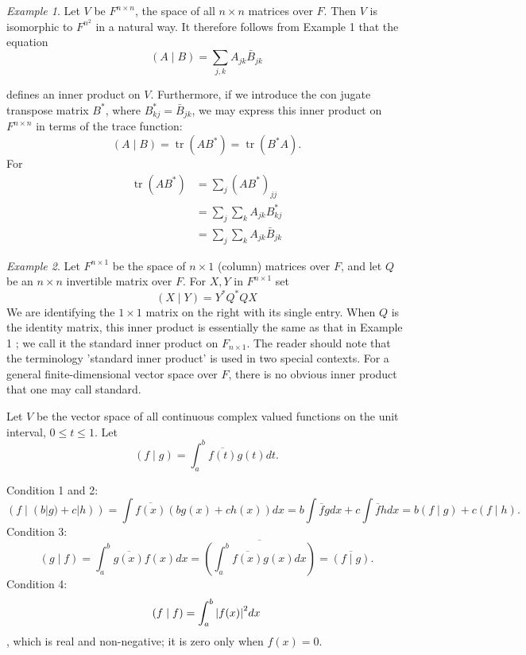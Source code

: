\documentclass{book}
\theoremstyle{remark}
\newtheorem{example}{Example}[section]
\theoremstyle{definition}
\begin{document}
\begin{example}
    Let $V$ be $F^{n \times n}$, the space of all $n \times n$ matrices over $F$. Then $V$ is isomorphic to $F^{n^2}$ in a natural way. It therefore follows from Example 1 that the equation
$$
(A \mid B)=\sum_{j, k} A_{j k} \bar{B}_{j k}
$$



defines an inner product on $V$. Furthermore, if we introduce the con jugate transpose matrix $B^*$, where $B_{k j}^*=\bar{B}_{j k}$, we may express this inner product on $F^{n \times n}$ in terms of the trace function:
$$
(A \mid B)=\operatorname{tr}\left(A B^*\right)=\operatorname{tr}\left(B^* A\right) .
$$
For
$$
\begin{aligned}
\operatorname{tr}\left(A B^*\right) & =\sum_j\left(A B^*\right)_{j j} \\
& =\sum_j \sum_k A_{j k} B_{k j}^* \\
& =\sum_j \sum_k A_{j k} \bar{B}_{j k}
\end{aligned}
$$

\end{example}
\begin{example}
Let $F^{n \times 1}$ be the space of $n \times 1$ (column) matrices over $F$, and let $Q$ be an $n \times n$ invertible matrix over $F$. For $X, Y$ in $F^{n \times 1}$ set
$$
(X \mid Y)=Y^* Q^* Q X
$$
We are identifying the $1 \times 1$ matrix on the right with its single entry. When $Q$ is the identity matrix, this inner product is essentially the same as that in Example 1 ; we call it the standard inner product on $F_{n \times 1}$. The reader should note that the terminology 'standard inner product' is used in two special contexts. For a general finite-dimensional vector space over $F$, there is no obvious inner product that one may call standard.
\end{example}
\example Let $V$ be the vector space of all continuous complex valued functions on the unit interval, $0 \leq t \leq 1$. Let
$$
(f \mid g)=\int_a^b \overline{f(t)} g(t) d t .
$$


Condition 1 and 2:
$$
( f \mid(b|g)+c|h))=\int \overline{f(x)}(b g(x)+c h(x)) d x=b \int \overline{f} g d x+c \int \overline{f} h d x=b( f \mid g)+c( f \mid h) .
$$
Condition 3:
$$
( g \mid f)=\int_a^b \overline{g(x)} f(x) d x=\overline{\left(\int_a^b \overline{f(x)} g(x) d x\right)}=\overline{( f \mid g)} .
$$
Condition 4:
$$(f \mid f) = \int_a^b \abs{f(x)}^2 dx $$,
which is real and non-negative; it is zero only when $f(x) = 0$. 
\end{document}
